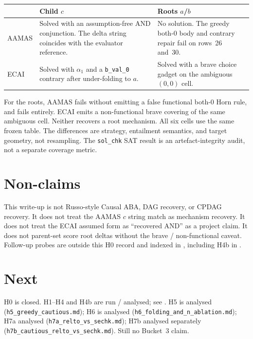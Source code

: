 \documentclass[11pt]{article}
\begin{document}
\begin{center}
\begin{tabular}{@{}lL{0.36\textwidth}L{0.36\textwidth}@{}}
\toprule
 & Child \(c\) & Roots \(a\)/\(b\) \\
\midrule
AAMAS &
  Solved with an assumption-free AND conjunction.
  The delta string coincides with the evaluator reference. &
  No solution.
  The greedy both-0 body and contrary repair fail on rows~26 and~30. \\
ECAI &
  Solved with \(\alpha_1\) and a \texttt{b\_val\_0} contrary after under-folding
  to \(a\). &
  Solved with a brave choice gadget on the ambiguous \((0,0)\) cell. \\
\bottomrule
\end{tabular}
\end{center}

For the roots, AAMAS fails without emitting a false functional both-0 Horn
rule, and fails entirely.
ECAI emits a non-functional brave covering of the same ambiguous cell.
Neither recovers a root mechanism.
All six cells use the same frozen table.
The differences are strategy, entailment semantics, and target geometry, not
resampling.
The \texttt{sol\_chk} SAT result is an artefact-integrity audit, not a separate
coverage metric.

\section{Non-claims}

This write-up is not Russo-style Causal ABA, DAG recovery, or CPDAG recovery.
It does not treat the AAMAS \(c\) string match as mechanism recovery.
It does not treat the ECAI assumed form as ``recovered AND'' as a project claim.
It does not parent-set score root deltas without the brave / non-functional
caveat.
Follow-up probes are outside this H0 record and indexed in
, including H4b in
.

\section{Next}

H0 is closed.
H1--H4 and H4b are run / analysed; see .
H5 is analysed (\texttt{h5\_greedy\_cautious.md}); H6 is analysed
(\texttt{h6\_folding\_and\_n\_ablation.md}); H7a analysed
(\texttt{h7a\_relto\_vs\_sechk.md}); H7b analysed separately
(\texttt{h7b\_cautious\_relto\_vs\_sechk.md}).
Still no Bucket~3 claim.
\end{document}
